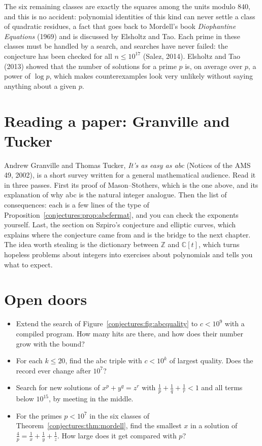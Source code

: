 \begin{remark}\label{conjectures:rem:esrest}
The six remaining classes are exactly the squares among the units modulo $840$, and this is no accident: polynomial identities of this kind can never
settle a class of quadratic residues, a fact that goes back to Mordell's book \emph{Diophantine Equations} (1969) and is discussed by Elsholtz and Tao.
Each prime in these classes must be handled by a search, and searches have never failed: the conjecture has been checked for all $n\le10^{17}$ (Salez,
2014). Elsholtz and Tao (2013) showed that the number of solutions for a prime $p$ is, on average over $p$, a power of $\log p$, which makes
counterexamples look very unlikely without saying anything about a given $p$.
\end{remark}

\section{Reading a paper: Granville and Tucker}

Andrew Granville and Thomas Tucker, \emph{It's as easy as abc} (Notices of the AMS 49, 2002), is a short survey written for a general mathematical
audience. Read it in three passes. First its proof of Mason--Stothers, which is the one above, and its explanation of why abc is the natural integer
analogue. Then the list of consequences: each is a few lines of the type of Proposition~\ref{conjectures:prop:abcfermat}, and you can check the exponents yourself.
Last, the section on Szpiro's conjecture and elliptic curves, which explains where the conjecture came from and is the bridge to the next chapter. The
idea worth stealing is the dictionary between $\mathbb Z$ and $\mathbb C[t]$, which turns hopeless problems about integers into exercises about
polynomials and tells you what to expect.

\section{Open doors}

\begin{itemize}
\item Extend the search of Figure~\ref{conjectures:fig:abcquality} to $c<10^9$ with a compiled program. How many hits are there, and how does their number grow
with the bound?
\item For each $k\le20$, find the abc triple with $c<10^k$ of largest quality. Does the record ever change after $10^7$?
\item Search for new solutions of $x^p+y^q=z^r$ with $\frac1p+\frac1q+\frac1r<1$ and all terms below $10^{15}$, by meeting in the middle.
\item For the primes $p<10^7$ in the six classes of Theorem~\ref{conjectures:thm:mordell}, find the smallest $x$ in a solution of $\frac4p=\frac1x+\frac1y+\frac1z$.
How large does it get compared with $p$?
\end{itemize}


